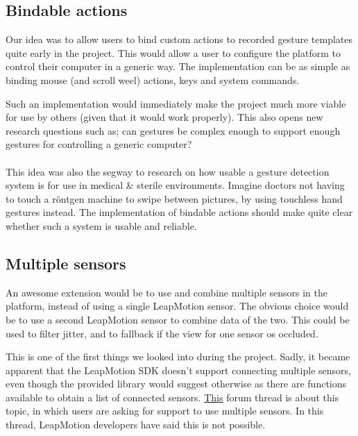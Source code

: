 \documentclass[a4paper]{article}
\begin{document}
  \subsection{Bindable actions}
  Our idea was to allow users to bind custom actions to recorded gesture
  templates quite early in the project. This would allow a user to configure the
  platform to control their computer in a generic way. The implementation can be
  as simple as binding mouse (and scroll weel) actions, keys and system commands.

  Such an implementation would immediately make the project much more viable for
  use by others (given that it would work properly). This also opens new
  research questions such as; can gestures be complex enough to support enough
  gestures for controlling a generic computer?

  \paragraph{}
  This idea was also the segway to research on how usable a gesture detection
  system is for use in medical \& sterile environments. Imagine doctors not
  having to touch a röntgen machine to swipe between pictures, by using
  touchless hand gestures instead. The implementation of bindable actions
  should make quite clear whether such a system is usable and reliable.

  \subsection{Multiple sensors}
  An awesome extension would be to use and combine multiple sensors in the
  platform, instead of using a single LeapMotion sensor. The obvious choice
  would be to use a second LeapMotion sensor to combine data of the two. This
  could be used to filter jitter, and to fallback if the view for one sensor os
  occluded.

  This is one of the first things we looked into during the project. Sadly, it
  became apparent that the LeapMotion SDK doesn't support connecting multiple
  sensors, even though the provided library would suggest otherwise as there are
  functions available to obtain a list of connected sensors.
  \href{https://forums.leapmotion.com/t/multiple-leap-motion-support/770}{This}
  forum thread is about this topic, in which users are asking for support to use
  multiple sensors. In this thread, LeapMotion developers have said this is not
  possible.
\end{document}
